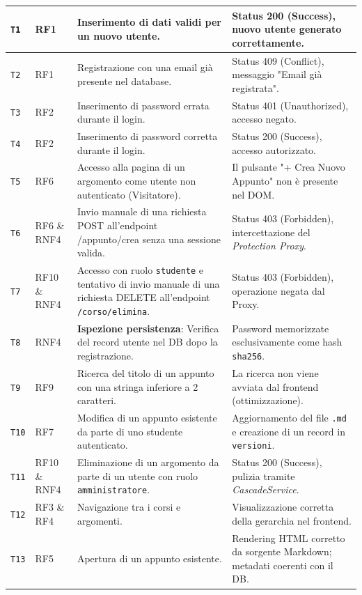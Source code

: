 \begin{longtable}[c]{|p{}|p{}|p{}|p{}|}
    \texttt{T1} & RF1 & Inserimento di dati validi per un nuovo utente. & Status 200 (Success), nuovo utente generato correttamente. \\ \hline
    \texttt{T2} & RF1 & Registrazione con una email già presente nel database. & Status 409 (Conflict), messaggio "Email già registrata". \\ \hline
    \texttt{T3} & RF2 & Inserimento di password errata durante il login. & Status 401 (Unauthorized), accesso negato. \\ \hline
    \texttt{T4} & RF2 & Inserimento di password corretta durante il login. & Status 200 (Success), accesso autorizzato. \\ \hline
    \texttt{T5} & RF6 & Accesso alla pagina di un argomento come utente non autenticato (Visitatore). & Il pulsante "+ Crea Nuovo Appunto" non è presente nel DOM. \\ \hline
    \texttt{T6} & RF6 \& RNF4 & Invio manuale di una richiesta POST all'endpoint /appunto/crea senza una sessione valida. & Status 403 (Forbidden), intercettazione del \textit{Protection Proxy}. \\ \hline
    \texttt{T7} & RF10 \& RNF4 & Accesso con ruolo \texttt{studente} e tentativo di invio manuale di una richiesta DELETE all'endpoint \texttt{/corso/elimina}. & Status 403 (Forbidden), operazione negata dal Proxy. \\ \hline
    \texttt{T8} & RNF4 & \textbf{Ispezione persistenza}: Verifica del record utente nel DB dopo la registrazione. & Password memorizzate esclusivamente come hash \texttt{sha256}. \\ \hline
    \texttt{T9} & RF9 & Ricerca del titolo di un appunto con una stringa inferiore a 2 caratteri. & La ricerca non viene avviata dal frontend (ottimizzazione). \\ \hline
    \texttt{T10} & RF7 & Modifica di un appunto esistente da parte di uno studente autenticato. & Aggiornamento del file \texttt{.md} e creazione di un record in \texttt{versioni}. \\ \hline
    \texttt{T11} & RF10 \& RNF4 & Eliminazione di un argomento da parte di un utente con ruolo \texttt{amministratore}. & Status 200 (Success), pulizia tramite \textit{CascadeService}. \\ \hline
    \texttt{T12} & RF3 \& RF4 & Navigazione tra i corsi e argomenti. & Visualizzazione corretta della gerarchia nel frontend. \\ \hline
    \texttt{T13} & RF5  & Apertura di un appunto esistente. & Rendering HTML corretto da sorgente Markdown; metadati coerenti con il DB. \\ \hline

\end{longtable}
